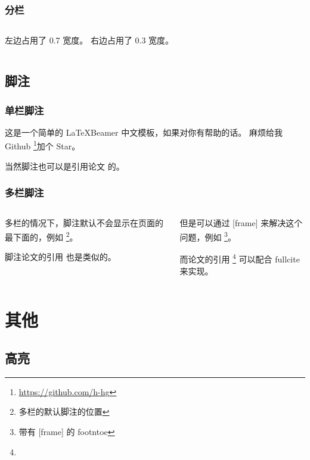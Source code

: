 \documentclass[
    10pt,
    pdf,
    UTF8,
    aspectratio=169
]{ctexbeamer}
\begin{document}
\begin{frame}
    \frametitle{分栏}
    \begin{columns}
        左边占用了 0.7 宽度。
        右边占用了 0.3 宽度。
    \end{columns}
\end{frame}

\subsection{脚注}

\begin{frame}
    \frametitle{单栏脚注}
    \hspace{2em} 这是一个简单的 \LaTeX Beamer 中文模板，如果对你有帮助的话。
    麻烦给我 Github \footnote{
        \url{https://github.com/h-hg}
    }加个 Star。

    \hspace{2em} 当然脚注也可以是引用论文  的。
\end{frame}

\begin{frame}
    \frametitle{多栏脚注}
    \begin{columns}
        \begin{column}{0.5\textwidth}
            \hspace{2em} 多栏的情况下，脚注默认不会显示在页面的最下面的，例如 \footnote{多栏的默认脚注的位置}。

            \hspace{2em} 脚注论文的引用  也是类似的。
        \end{column}
        \begin{column}{0.5\textwidth}
            \hspace{2em} 但是可以通过 [frame] 来解决这个问题，例如 \footnote[frame]{带有 [frame] 的 footntoe}。

            \hspace{2em} 而论文的引用 \footnote[frame]{} 可以配合 fullcite 来实现。
        \end{column}
    \end{columns}
\end{frame}

\section{其他}

\subsection{高亮}
\end{document}
